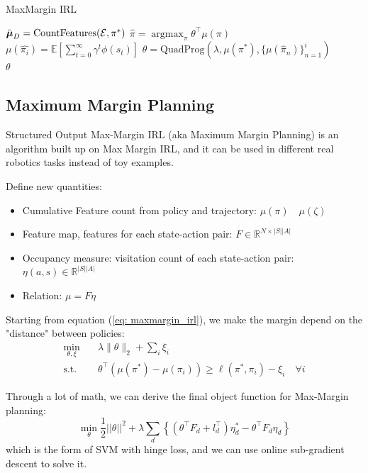 \documentclass[11pt]{article}
\begin{document}
\begin{algorithm}
\caption{MaxMargin IRL}
\label{alg:maxmargin}
\begin{algorithmic}[1]
\State $\Bar{\boldsymbol\mu}_D = \text{CountFeatures} (\mathcal{E}, \pi^*)$
    \State $\hat{\pi} = \mathop{argmax}_\pi \theta^\intercal \mu(\pi)$ 
    \State $\mu(\hat{\pi_i}) = \mathbb{E}\left[ \sum_{t=0}^\infty \gamma^t \phi(s_t) \right]$ 
    \State $\theta = \text{QuadProg}(\lambda, \mu(\pi^*), \{ \mu(\hat{\pi}_n) \}_{n=1}^i)$ 
\EndFor \\
\Return $\theta$
\EndFunction
\end{algorithmic}
\end{algorithm}

\subsection{Maximum Margin Planning}
Structured Output Max-Margin IRL (aka Maximum Margin Planning) is an algorithm built up on Max Margin IRL, and it can be used in different real robotics tasks instead of toy examples.

Define new quantities:
\begin{itemize}
    \item Cumulative Feature count from policy and trajectory: $\mu(\pi) \quad \mu(\zeta)$
    \item Feature map, features for each state-action pair: $F \in \mathbb{R}^{N \times |S||A|}$
    \item Occupancy measure: visitation count of each state-action pair: $\eta(a,s) \in \mathbb{R}^{|S||A|}$
    \item Relation: $\mu = F \eta$
\end{itemize}

Starting from equation (\ref{eq: maxmargin_irl}), we make the margin depend on the "distance" between policies:
\begin{align*}
    \min_{\theta, \xi} \quad & \lambda \lVert\theta\rVert_2 + \sum_i \xi_i \\
    \textrm{s.t.} \quad & \theta^\intercal (\mu(\pi^*)-\mu(\pi_i)) \geq \ell(\pi^*, \pi_i)-\xi_i \quad \forall i
\end{align*}

Through a lot of math, we can derive the final object function for Max-Margin planning:
\[ \min_{\theta} \frac{1}{2}||{\theta}||^2 + \lambda \sum_d \left\{ ({\theta}^\intercal F_d + l_d^\intercal)\eta_d^* - \theta^\intercal F_d \eta_d \right\} \]
which is the form of SVM with hinge loss, and we can use online sub-gradient descent to solve it.
\end{document}
